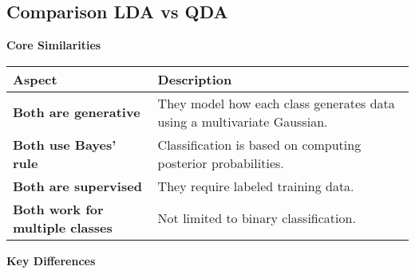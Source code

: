 \subsection{Comparison LDA vs QDA}

\highspace
\begin{flushleft}
    \textcolor{Green3}{ \textbf{Core Similarities}}
\end{flushleft}

\begin{table}[!htp]
    \centering
    \begin{tabular}{@{} l p{18em} @{}}
        \toprule
        Aspect & Description \\
        \midrule
        \textbf{Both are generative}            & They model how each class generates data using a multivariate Gaussian.   \\ [.3em]
        \textbf{Both use Bayes' rule}           & Classification is based on computing posterior probabilities.             \\ [.3em]
        \textbf{Both are supervised}            & They require labeled training data.                                       \\ [.3em]
        \textbf{Both work for multiple classes} & Not limited to binary classification.                                     \\
        \bottomrule
    \end{tabular}
\end{table}

\highspace
\begin{flushleft}
    \textcolor{Green3}{ \textbf{Key Differences}}
\end{flushleft}

